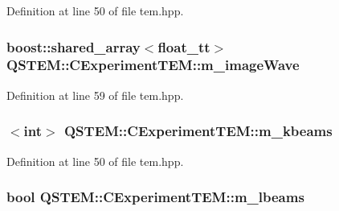 Definition at line 50 of file tem.\-hpp.

\hypertarget{class_q_s_t_e_m_1_1_c_experiment_t_e_m_a83abce7927e8f98feb653c454a0b1209}{
\subsubsection[{m\-\_\-image\-Wave}]{\setlength{\rightskip}{0pt plus 5cm}boost\-::shared\-\_\-array$<${\bf float\-\_\-tt}$>$ Q\-S\-T\-E\-M\-::\-C\-Experiment\-T\-E\-M\-::m\-\_\-image\-Wave\hspace{0.3cm}{\ttfamily [protected]}}}\label{class_q_s_t_e_m_1_1_c_experiment_t_e_m_a83abce7927e8f98feb653c454a0b1209}


Definition at line 59 of file tem.\-hpp.

\hypertarget{class_q_s_t_e_m_1_1_c_experiment_t_e_m_a6d5aff0ed8f4f9e0741c3394f9015e3d}{
\subsubsection[{m\-\_\-kbeams}]{$<$int$>$ Q\-S\-T\-E\-M\-::\-C\-Experiment\-T\-E\-M\-::m\-\_\-kbeams\hspace{0.3cm}{\ttfamily [protected]}}}\label{class_q_s_t_e_m_1_1_c_experiment_t_e_m_a6d5aff0ed8f4f9e0741c3394f9015e3d}


Definition at line 50 of file tem.\-hpp.

\hypertarget{class_q_s_t_e_m_1_1_c_experiment_t_e_m_af8861c5a935974357122c8a46a3ff4e8}{
\subsubsection[{m\-\_\-lbeams}]{\setlength{\rightskip}{0pt plus 5cm}bool Q\-S\-T\-E\-M\-::\-C\-Experiment\-T\-E\-M\-::m\-\_\-lbeams\hspace{0.3cm}{\ttfamily [protected]}}}\label{class_q_s_t_e_m_1_1_c_experiment_t_e_m_af8861c5a935974357122c8a46a3ff4e8}


